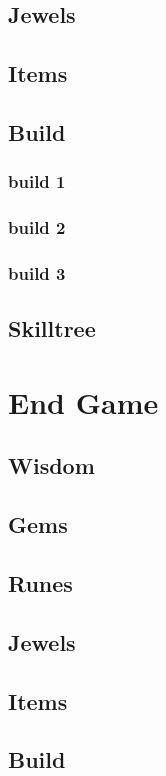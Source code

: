 \documentclass[14pt]{article}
\begin{document}
\subsection{Jewels}
\subsection{Items}
\subsection{Build}
\subsubsection{build 1}
\subsubsection{build 2}
\subsubsection{build 3}
\subsection{Skilltree}

\newpage

\section{End Game}
\subsection{Wisdom}
\subsection{Gems}
\subsection{Runes}
\subsection{Jewels}
\subsection{Items}
\subsection{Build}
\end{document}
